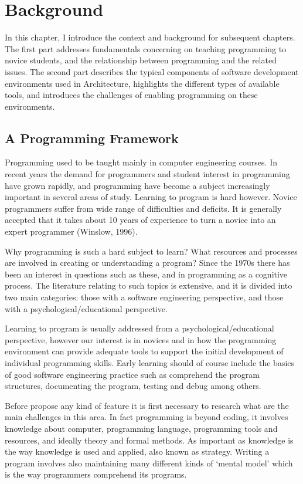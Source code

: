
\chapter{Background}
\label{chapter:background}

In this chapter, I introduce the context and background for subsequent chapters. The first part addresses fundamentals concerning on teaching programming to novice students, and the relationship between programming and the related issues. The second part describes the typical components of software development environments used in Architecture, highlights the different types of available tools, and introduces the challenges of enabling programming on these environments.

\section{A Programming Framework}

Programming used to be taught mainly in computer engineering courses. In recent years the demand for programmers and student interest in programming have grown rapidly, and programming have become a subject increasingly important in several areas of study. Learning to program is hard however. Novice programmers suffer from wide range of difficulties and deficits. It is generally accepted that it takes about 10 years of experience to turn a novice into an expert programmer (Winslow, 1996).

Why programming is such a hard subject to learn? What resources and
processes are involved in creating or understanding a program? Since the 1970s there has been an interest in questions such as these, and in programming as a cognitive process. The literature relating to such topics is extensive, and it is divided into two main categories: those with a software engineering perspective, and those with a psychological/educational perspective.

Learning to program is usually addressed from a psychological/educational perspective, however our interest is in novices and in how the programming environment can provide adequate tools to support the initial development of individual programming skills. Early learning should of course include the basics of good software engineering practice such as comprehend the program structures, documenting the program, testing and debug among others.

Before propose any kind of feature it is first necessary to research what are the main challenges in this area. In fact programming is beyond coding, it involves knowledge about computer, programming language, programming tools and resources, and ideally theory and formal methods. As important as knowledge is the way knowledge is used and applied, also known as strategy. Writing a program involves also maintaining many different kinds of ‘mental model’ which is the way programmers comprehend its programs.

